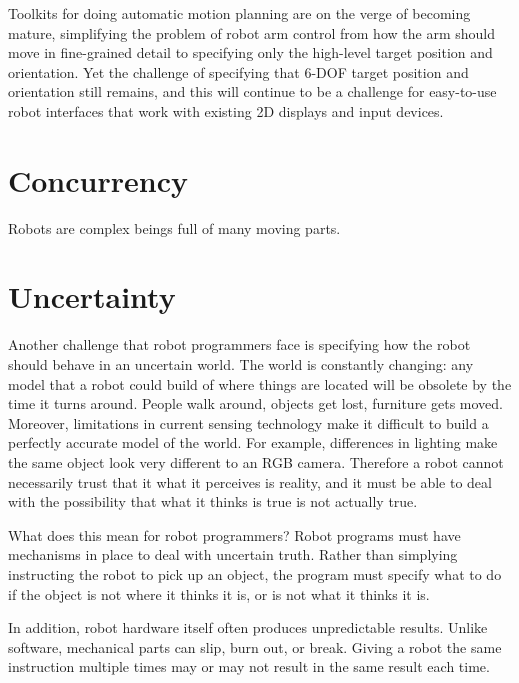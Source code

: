 \documentclass{article}
\begin{document}
Toolkits for doing automatic motion planning are on the verge of becoming mature, simplifying the problem of robot arm control from how the arm should move in fine-grained detail to specifying only the high-level target position and orientation. Yet the challenge of specifying that 6-DOF target position and orientation still remains, and this will continue to be a challenge for easy-to-use robot interfaces that work with existing 2D displays and input devices.

\section{Concurrency}


Robots are complex beings full of many moving parts. 

\section{Uncertainty}


Another challenge that robot programmers face is specifying how the robot should behave in an uncertain world. The world is constantly changing: any model that a robot could build of where things are located will be obsolete by the time it turns around. People walk around, objects get lost, furniture gets moved. Moreover, limitations in current sensing technology make it difficult to build a perfectly accurate model of the world. For example, differences in lighting make the same object look very different to an RGB camera. Therefore a robot cannot necessarily trust that it what it perceives is reality, and it must be able to deal with the possibility that what it thinks is true is not actually true.

What does this mean for robot programmers? Robot programs must have mechanisms in place to deal with uncertain truth. Rather than simplying instructing the robot to pick up an object, the program must specify what to do if the object is not where it thinks it is, or is not what it thinks it is.

In addition, robot hardware itself often produces unpredictable results. Unlike software, mechanical parts can slip, burn out, or break. Giving a robot the same instruction multiple times may or may not result in the same result each time.
\end{document}
